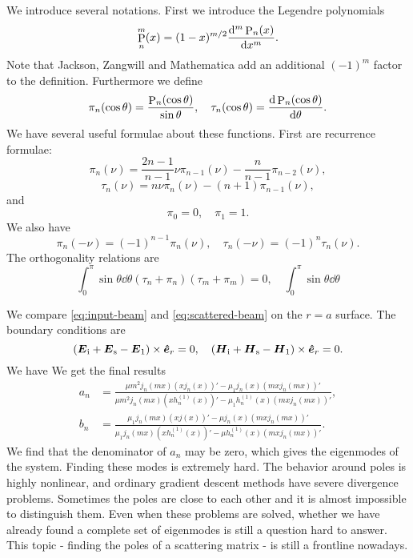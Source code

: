 \documentclass[hyperref, a4paper]{article}
\DeclareMathOperator{\legpoly}{P}
\begin{document}
We introduce several notations. First we introduce the Legendre polynomials
\begin{equation}
    \legpoly^m_n(x) = (1 - x)^{m/2} \dv[m]{\legpoly_n(x)}{x}.
\end{equation} 
Note that Jackson, Zangwill and Mathematica add an additional $(-1)^m$ factor to the definition.
Furthermore we define 
\begin{equation}
    \pi_n(\cos \theta) = \frac{\legpoly_n(\cos \theta)}{\sin \theta}, \quad 
    \tau_n(\cos \theta) = \dv{\legpoly_n (\cos \theta)}{\theta}.
\end{equation}
We have several useful formulae about these functions. First are recurrence formulae:
\begin{equation}
    \pi_n(\nu) = \frac{2n-1}{n-1} \nu \pi_{n-1}(\nu) - \frac{n}{n-1} \pi_{n-2}(\nu),
\end{equation}
\begin{equation}
    \tau_n(\nu) = n \nu \pi_n(\nu) - (n+1) \pi_{n-1}(\nu),
\end{equation}
and 
\begin{equation}
    \pi_0 = 0, \quad \pi_1 = 1.
\end{equation}
We also have 
\begin{equation}
    \pi_n(-\nu) = (-1)^{n-1} \pi_n(\nu), \quad \tau_n(-\nu) = (-1)^n \tau_n(\nu).
\end{equation}
The orthogonality relations are 
\begin{equation}
    \int_0^\pi \sin \theta \dd{\theta} (\tau_n + \pi_n) (\tau_m + \pi_m) = 0, \quad 
    \int_0^\pi \sin \theta \dd{\theta}
\end{equation}

We compare \eqref{eq:input-beam} and \eqref{eq:scattered-beam} on the $r=a$ surface. 
The boundary conditions are 
\[
    (\vb*{E}_\text{i} + \vb*{E}_\text{s} - \vb*{E}_1) \times \vu*{e}_r = 0, \quad 
    (\vb*{H}_\text{i} + \vb*{H}_\text{s} - \vb*{H}_1) \times \vu*{e}_r = 0.
\]
We have 
We get the final results 
\begin{equation}
    \begin{aligned}
        a_n &= \frac{\mu m^2 j_n(mx) (x j_n(x))' - \mu_1 j_n(x) (mx j_n(mx))'}{
        \mu m^2 j_n(mx) (x h^{(1)}_n(x))' - \mu_1 h_n^{(1)}(x) (mx j_n(mx))'}, \\
        b_n &= \frac{\mu_1 j_n(mx) (x j(x))' - \mu j_n(x) (mx j_n(mx))'}{
        \mu_1 j_n(mx) (x h^{(1)}_n(x))' - \mu h_n^{(1)}(x) (mx j_n(mx))' }.
    \end{aligned}
\end{equation}
We find that the denominator of $a_n$ may be zero, which gives the eigenmodes of the system.
Finding these modes is extremely hard. The behavior around poles is highly nonlinear, and ordinary 
gradient descent methods have severe divergence problems. Sometimes the poles are close to each other 
and it is almost impossible to distinguish them. Even when these problems are solved, whether we 
have already found a complete set of eigenmodes is still a question hard to answer. 
This topic - finding the poles of a scattering matrix - is still a frontline nowadays.
\end{document}
